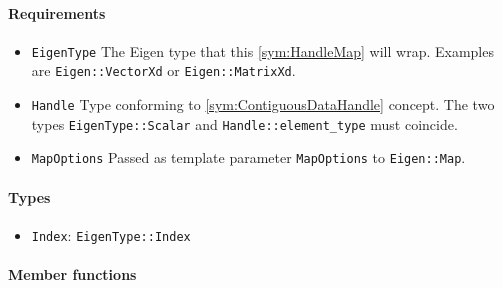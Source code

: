 \paragraph{Requirements}

\begin{itemize}
	\item \texttt{EigenType} The Eigen type that this \ref{sym:HandleMap} will wrap. Examples are \texttt{Eigen::VectorXd} or \texttt{Eigen::MatrixXd}.
	\item \texttt{Handle} Type conforming to \ref{sym:ContiguousDataHandle} concept. The two types \texttt{EigenType::Scalar} and \texttt{Handle::element\_type} must coincide.
	\item \texttt{MapOptions} Passed as template parameter \texttt{MapOptions} to \texttt{Eigen::Map}.
\end{itemize}

\paragraph{Types}

\begin{itemize}
	\item \texttt{Index}: \texttt{EigenType::Index}
\end{itemize}

\paragraph{Member functions}

